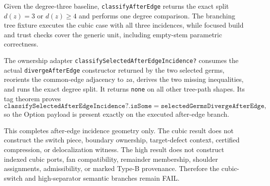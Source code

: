 \documentclass[11pt]{article}
\begin{document}
Given the degree-three baseline, \texttt{classifyAfterEdge} returns the exact
split $d(z)=3$ or $d(z)\ge4$ and performs one degree comparison.  The branching
tree fixture executes the cubic case with all three incidences, while focused
build and trust checks cover the generic unit, including empty-stem
parametric correctness.

The ownership adapter
\texttt{classifySelectedAfterEdgeIncidence?} consumes the actual
\texttt{divergeAfterEdge} constructor returned by the two selected germs,
reorients the common-edge adjacency to $za$, derives the two missing
inequalities, and runs the exact degree split.  It returns \texttt{none} on
all other tree-path shapes.  Its tag theorem proves
\[
 \texttt{classifySelectedAfterEdgeIncidence?.isSome}
 =\texttt{selectedGermsDivergeAfterEdge},
\]
so the Option payload is present exactly on the executed after-edge branch.

This completes after-edge incidence geometry only.  The cubic result does not
construct the switch piece, boundary ownership, target-defect context,
certified compression, or delocalization witness.  The high result does not
construct indexed cubic ports, fan compatibility, remainder membership,
shoulder assignments, admissibility, or marked Type-B provenance.  Therefore
the cubic-switch and high-separator semantic branches remain FAIL.
\end{document}
